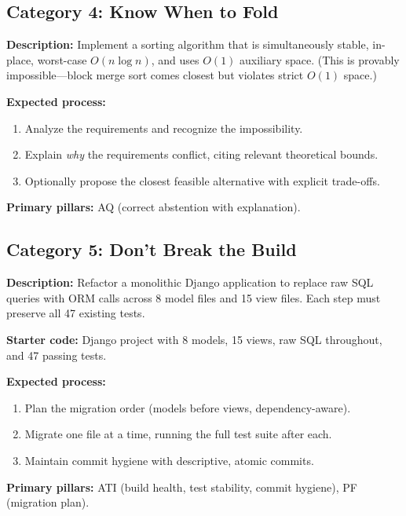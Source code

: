 \documentclass[letterpaper, 10 pt, conference]{ieeeconf}
\begin{document}
\subsection{Category 4: Know When to Fold}

\begin{tcolorbox}[colback=lightgray, colframe=pillarred, title={Task KWF-1: Conflicting Requirements}]
\textbf{Description:} Implement a sorting algorithm that is simultaneously stable, in-place, worst-case $O(n \log n)$, and uses $O(1)$ auxiliary space. (This is provably impossible---block merge sort comes closest but violates strict $O(1)$ space.)

\textbf{Expected process:}
\begin{enumerate}[itemsep=1pt]
  \item Analyze the requirements and recognize the impossibility.
  \item Explain \emph{why} the requirements conflict, citing relevant theoretical bounds.
  \item Optionally propose the closest feasible alternative with explicit trade-offs.
\end{enumerate}

\textbf{Primary pillars:} AQ (correct abstention with explanation).
\end{tcolorbox}

\subsection{Category 5: Don't Break the Build}

\begin{tcolorbox}[colback=lightgray, colframe=pillarpurple, title={Task DBB-1: Database Migration Refactor}]
\textbf{Description:} Refactor a monolithic Django application to replace raw SQL queries with ORM calls across 8 model files and 15 view files. Each step must preserve all 47 existing tests.

\textbf{Starter code:} Django project with 8 models, 15 views, raw SQL throughout, and 47 passing tests.

\textbf{Expected process:}
\begin{enumerate}[itemsep=1pt]
  \item Plan the migration order (models before views, dependency-aware).
  \item Migrate one file at a time, running the full test suite after each.
  \item Maintain commit hygiene with descriptive, atomic commits.
\end{enumerate}

\textbf{Primary pillars:} ATI (build health, test stability, commit hygiene), PF (migration plan).
\end{tcolorbox}
\end{document}
